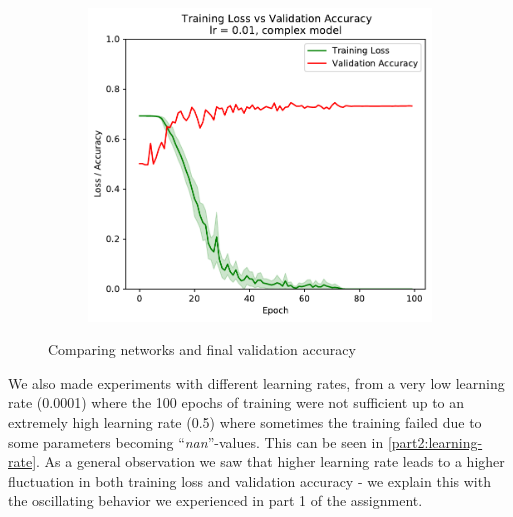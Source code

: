\documentclass[sigconf,nonacm]{acmart}
\begin{document}
\begin{figure}[ht]
\begin{subfigure}[c]{0.3\columnwidth}
\end{subfigure}
\hspace{2pt}
\begin{subfigure}[c]{0.3\columnwidth}
\includegraphics[width=\textwidth]{plot_complex_0_01.pdf}
\end{subfigure}
\vspace{-.7\baselineskip}
\caption{Comparing networks and final validation accuracy}
\label{part2:network}
\end{figure}
  
We also made experiments with different learning rates,
from a very low learning rate (0.0001) where the
100 epochs of training were not sufficient up to an
extremely high learning rate (0.5) where sometimes the
training failed due to some parameters becoming
``\emph{nan}''-values. This can be seen in
\ref{part2:learning-rate}.
As a general observation we saw that higher learning
rate leads to a higher fluctuation in both training
loss and validation accuracy - we explain this
with the oscillating behavior we experienced in
part 1 of the assignment.
\end{document}
